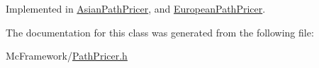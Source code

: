 Implemented in \hyperlink{class_asian_path_pricer_adb10ce912ab34560d762ce0523ae394e}{Asian\+Path\+Pricer}, and \hyperlink{class_european_path_pricer_ac12142089ccdc7fe73ba93d66a7964e6}{European\+Path\+Pricer}.



The documentation for this class was generated from the following file\+:\begin{DoxyCompactItemize}
\item 
Mc\+Framework/\hyperlink{_path_pricer_8h}{Path\+Pricer.\+h}\end{DoxyCompactItemize}
